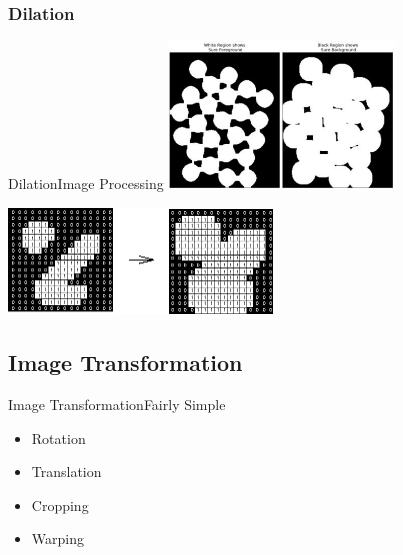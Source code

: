 \documentclass{beamer}
\begin{document}
\subsubsection{Dilation}
\begin{frame}{Dilation}{Image Processing}
\centering
    \includegraphics[width=60mm]{images/dilated.jpg}    

\centering
    \includegraphics[width=70mm]{images/dilation.png}


\end{frame}
\subsection{Image Transformation}

\begin{frame}{Image Transformation}{Fairly Simple}
\begin{itemize}
\item Rotation 
\item Translation
\item Cropping
\item Warping
\end{itemize}
\end{frame}
\end{document}
